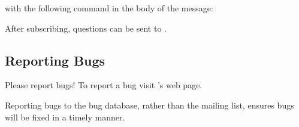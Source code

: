 
with the following command in the body of the message:


After subscribing, questions can be sent to
.

\subsection{Reporting Bugs}
\label{sec:bugs}

Please report bugs!  To report a bug visit \sr{}'s
 web page.

Reporting bugs to the bug database, rather than the mailing list,  ensures
bugs will be fixed in a timely manner.

